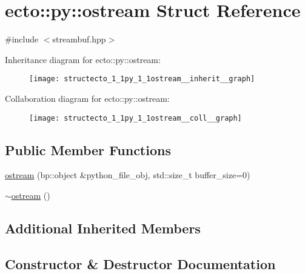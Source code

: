 \hypertarget{structecto_1_1py_1_1ostream}{}\section{ecto\+:\+:py\+:\+:ostream Struct Reference}
\label{structecto_1_1py_1_1ostream}


{\ttfamily \#include $<$streambuf.\+hpp$>$}



Inheritance diagram for ecto\+:\+:py\+:\+:ostream\+:\nopagebreak
\begin{figure}[H]
\begin{center}
\leavevmode
\texttt{[image: structecto\_1\_1py\_1\_1ostream\_\_inherit\_\_graph]}
\end{center}
\end{figure}


Collaboration diagram for ecto\+:\+:py\+:\+:ostream\+:\nopagebreak
\begin{figure}[H]
\begin{center}
\leavevmode
\texttt{[image: structecto\_1\_1py\_1\_1ostream\_\_coll\_\_graph]}
\end{center}
\end{figure}
\subsection*{Public Member Functions}
\begin{DoxyCompactItemize}
\item 
\hyperlink{structecto_1_1py_1_1ostream_a5fc23212b0b77a69a0c4e7e67133b2c8}{ostream} (bp\+::object \&python\+\_\+file\+\_\+obj, std\+::size\+\_\+t buffer\+\_\+size=0)
\item 
\hyperlink{structecto_1_1py_1_1ostream_a69cba9ec021b14b76fd08d35ea322434}{$\sim$ostream} ()
\end{DoxyCompactItemize}
\subsection*{Additional Inherited Members}


\subsection{Constructor \& Destructor Documentation}
